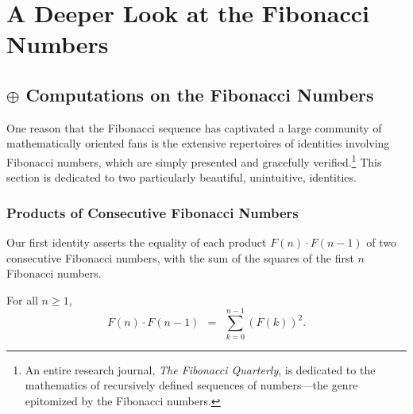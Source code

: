 
\chapter{A Deeper Look at the Fibonacci Numbers}
\label{ch:FIBO-enrich}

\noindent {}


\section{$\oplus$ Computations on the Fibonacci Numbers}
\label{sec:FIBO-enrich-ops}

One reason that the Fibonacci sequence has captivated a large community of mathematically oriented fans is the extensive repertoires of identities involving Fibonacci numbers, which are simply presented and gracefully verified.\footnote{An entire research journal, {\it The Fibonacci Quarterly}, is dedicated to the mathematics of recursively defined sequences of numbers---the genre epitomized by the Fibonacci numbers.}  This section is dedicated to two particularly beautiful,  unintuitive, identities.

\subsection{Products of Consecutive Fibonacci Numbers}
\label{sec:product-Fn-Fn+1}

Our first identity asserts the equality of each product $F(n) \cdot F(n-1)$ of two consecutive Fibonacci numbers, with the sum of the squares of the first $n$ Fibonacci numbers.

\begin{prop} 
\label{thm:FiboSumConsecutive}
For all $n \geq 1$,
\begin{equation}
\label{eq:FiboSumConsecutive}
F(n) \cdot F(n-1) \ \ = \ \ \sum_{k=0}^{n-1} (F(k))^2.
\end{equation}
\end{prop}

